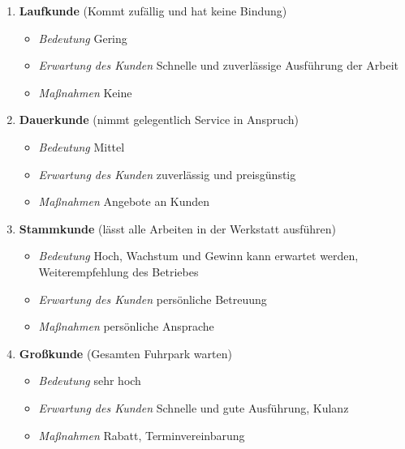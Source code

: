 \begin{enumerate}
\item
  \textbf{Laufkunde} (Kommt zufällig und hat keine Bindung)

  \begin{itemize}
  \item
    \emph{Bedeutung} Gering
  \item
    \emph{Erwartung des Kunden} Schnelle und zuverlässige Ausführung der
    Arbeit
  \item
    \emph{Maßnahmen} Keine
  \end{itemize}
\item
  \textbf{Dauerkunde} (nimmt gelegentlich Service in Anspruch)

  \begin{itemize}
  \item
    \emph{Bedeutung} Mittel
  \item
    \emph{Erwartung des Kunden} zuverlässig und preisgünstig
  \item
    \emph{Maßnahmen} Angebote an Kunden
  \end{itemize}
\item
  \textbf{Stammkunde} (lässt alle Arbeiten in der Werkstatt ausführen)

  \begin{itemize}
  \item
    \emph{Bedeutung} Hoch, Wachstum und Gewinn kann erwartet werden,
    Weiterempfehlung des Betriebes
  \item
    \emph{Erwartung des Kunden} persönliche Betreuung
  \item
    \emph{Maßnahmen} persönliche Ansprache
  \end{itemize}
\item
  \textbf{Großkunde} (Gesamten Fuhrpark warten)

  \begin{itemize}
  \item
    \emph{Bedeutung} sehr hoch
  \item
    \emph{Erwartung des Kunden} Schnelle und gute Ausführung, Kulanz
  \item
    \emph{Maßnahmen} Rabatt, Terminvereinbarung
  \end{itemize}
\end{enumerate}

